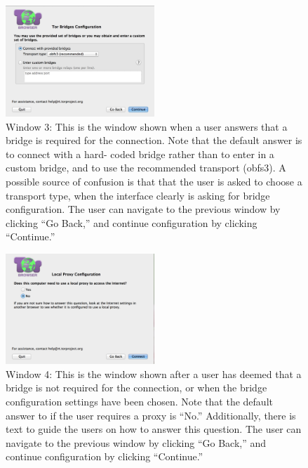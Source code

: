 \documentclass{template}
\begin{document}
\begin{figure}[h]
\label{fig:window3}
  \centering
    \includegraphics[width=0.5\textwidth]{window3.png}
    \caption{Window 3: This is the window shown when a user answers that a bridge 
    is required for the connection. Note that the default answer is to connect with a hard-
    coded bridge rather than to enter in a custom bridge, and to use the recommended 
    transport (obfs3). A possible source of confusion is that that the user is asked to choose 
    a transport type, when the interface clearly is asking for bridge configuration. The user 
    can navigate to the previous window by clicking ``Go Back,'' and continue configuration 
    by clicking  ``Continue.''}
\end{figure}

\begin{figure}[h]
\label{fig:window4}
  \centering
    \includegraphics[width=0.5\textwidth]{window4.png}
    \caption{Window 4: This is the window shown after a user has deemed that a bridge
    is not required for the connection, or when the bridge configuration settings have been 
    chosen. Note that the default answer to if the user requires a proxy is ``No.'' Additionally,
    there is text to guide the users on how to answer this question. The user 
    can navigate to the previous window by clicking ``Go Back,'' and continue configuration 
    by clicking  ``Continue.''}
\end{figure}
\end{document}

